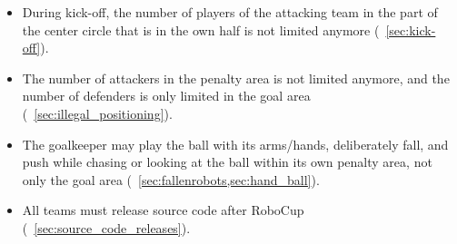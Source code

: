 \begin{itemize}
  \item During kick-off, the number of players of the attacking team in the part of the center circle that is in the own half is not limited anymore (\cf~\cref{sec:kick-off}).
  \item The number of attackers in the penalty area is not limited anymore, and the number of defenders is only limited in the goal area (\cf~\cref{sec:illegal_positioning}).
  \item The goalkeeper may play the ball with its arms/hands, deliberately fall, and push while chasing or looking at the ball within its own penalty area, not only the goal area (\cf~\cref{sec:fallenrobots,sec:hand_ball}).
  \item All teams must release source code after RoboCup (\cf~\cref{sec:source_code_releases}).
\end{itemize}
